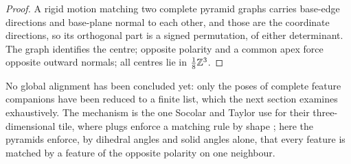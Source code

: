 \begin{proof}
A rigid motion matching two complete pyramid graphs carries base-edge directions and base-plane
normal to each other, and those are the coordinate directions, so its orthogonal part is a
signed permutation, of either determinant. The graph identifies the centre; opposite polarity and
a common apex force opposite outward normals; all centres lie in $\tfrac18\mathbb{Z}^3$.
\end{proof}

No global alignment has been concluded yet: only the poses of complete feature companions have
been reduced to a finite list, which the next section examines exhaustively. The mechanism is the
one Socolar and Taylor use for their three-dimensional tile, where plugs enforce a matching rule
by shape \cite{ST11}; here the pyramids enforce, by dihedral angles and solid angles alone, that
every feature is matched by a feature of the opposite polarity on one neighbour.
